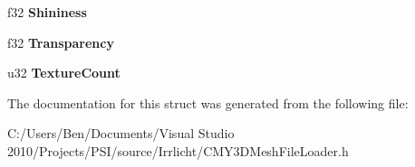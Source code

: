 \begin{DoxyCompactItemize}
\item 
\hypertarget{structirr_1_1scene_1_1_s_my_material_header_aa9b590a4834acb7933efcc376b8f6b3d}{f32 {\bfseries Shininess}}\label{structirr_1_1scene_1_1_s_my_material_header_aa9b590a4834acb7933efcc376b8f6b3d}

\item 
\hypertarget{structirr_1_1scene_1_1_s_my_material_header_a4a4a668e8ce0cda7579bfa5c010ed47b}{f32 {\bfseries Transparency}}\label{structirr_1_1scene_1_1_s_my_material_header_a4a4a668e8ce0cda7579bfa5c010ed47b}

\item 
\hypertarget{structirr_1_1scene_1_1_s_my_material_header_a88ab02a25c8f7b8d50f3e136c66ba4f6}{u32 {\bfseries Texture\-Count}}\label{structirr_1_1scene_1_1_s_my_material_header_a88ab02a25c8f7b8d50f3e136c66ba4f6}

\end{DoxyCompactItemize}


The documentation for this struct was generated from the following file\-:\begin{DoxyCompactItemize}
\item 
C\-:/\-Users/\-Ben/\-Documents/\-Visual Studio 2010/\-Projects/\-P\-S\-I/source/\-Irrlicht/C\-M\-Y3\-D\-Mesh\-File\-Loader.\-h\end{DoxyCompactItemize}
